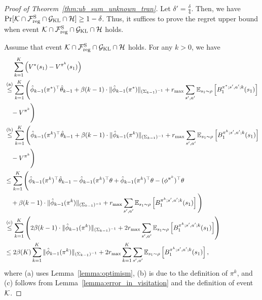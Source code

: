 \begin{proof}[Proof of Theorem~\ref{thm:ub_sum_unknown_tran}]
	Let $\delta'=\frac{\delta}{4}$. Then, we have $\Pr[\mathcal{K} \cap \mathcal{F}^{\textup{S}}_{\textup{reg}} \cap \mathcal{G}_{\textup{KL}} \cap \mathcal{H}] \geq 1-\delta$.
	Thus, it suffices to prove the regret upper bound when event $\mathcal{K} \cap \mathcal{F}^{\textup{S}}_{\textup{reg}} \cap \mathcal{G}_{\textup{KL}} \cap \mathcal{H}$ holds. 
	
	Assume that event $\mathcal{K} \cap \mathcal{F}^{\textup{S}}_{\textup{reg}} \cap \mathcal{G}_{\textup{KL}} \cap \mathcal{H}$ holds.
	For any $k>0$, we have
	\begin{align}
		&\quad\ \sum_{k=1}^{K} \left(  V^*(s_1)-V^{\pi^k}(s_1)  \right) 
		\nonumber\\
		&\overset{\textup{(a)}}{\leq}  \sum_{k=1}^{K} \Bigg( \hat{\phi}_{k-1}(\pi^*)^\top \hat{\theta}_{k-1} + \beta(k-1) \cdot  \|\hat{\phi}_{k-1}(\pi^*)\|_{(\Sigma_{k-1})^{-1}} + r_{\max} \sum_{s',a'} \mathbb{E}_{s_1 \sim \rho}\left[ B^{\pi^*;s',a';k}_1(s_1) \right] 
		\nonumber\\
		&\quad - V^{\pi^k} \Bigg)
		\nonumber\\
		&\overset{\textup{(b)}}{\leq}  \sum_{k=1}^{K} \Bigg( \hat{\phi}_{k-1}(\pi^k)^\top \hat{\theta}_{k-1} + \beta(k-1) \cdot  \|\hat{\phi}_{k-1}(\pi^k)\|_{(\Sigma_{k-1})^{-1}} + r_{\max} \sum_{s',a'} \mathbb{E}_{s_1 \sim \rho}\left[ B^{\pi^k;s',a';k}_1(s_1) \right] 
		\nonumber\\
		&\quad - V^{\pi^k} \Bigg)
		\nonumber\\
		&\leq \sum_{k=1}^{K} \Bigg( \hat{\phi}_{k-1}(\pi^k)^\top \hat{\theta}_{k-1} - \hat{\phi}_{k-1}(\pi^k)^\top\theta + \hat{\phi}_{k-1}(\pi^k)^\top\theta - (\phi^{\pi^k})^\top\theta \nonumber\\& \quad+ \beta(k-1) \cdot  \|\hat{\phi}_{k-1}(\pi^k)\|_{(\Sigma_{k-1})^{-1}}  + r_{\max} \sum_{s',a'} \mathbb{E}_{s_1 \sim \rho}\left[ B^{\pi^k;s',a';k}_1(s_1) \right] \Bigg) 
		\nonumber\\
		&\overset{\textup{(c)}}{\leq} \sum_{k=1}^{K} \left( 2 \beta(k-1) \cdot  \|\hat{\phi}_{k-1}(\pi^k)\|_{(\Sigma_{k-1})^{-1}} + 2 r_{\max} \sum_{s',a'} \mathbb{E}_{s_1 \sim \rho}\left[ B^{\pi^k;s',a';k}_1(s_1) \right]  \right)
		\nonumber\\
		&\leq  2 \beta(K)  \sum_{k=1}^{K} \|\hat{\phi}_{k-1}(\pi^k)\|_{(\Sigma_{k-1})^{-1}} + 2 r_{\max} \sum_{k=1}^{K} \sum_{s',a'} \mathbb{E}_{s_1 \sim \rho}\left[ B^{\pi^k;s',a';k}_1(s_1) \right] , \label{eq:regret_decomp_unknown_tran_seg}
	\end{align}
	where (a) uses Lemma~\ref{lemma:optimism}, (b) is due to the definition of $\pi^k$, and (c) follows from Lemma~\ref{lemma:error_in_visitation} and the definition of event $\mathcal{K}$. 
	

\end{proof}
